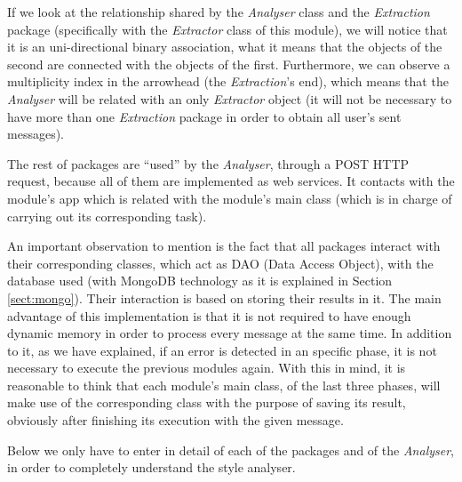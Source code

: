 If we look at the relationship shared by the \textit{Analyser} class and the \textit{Extraction} package (specifically with the \textit{Extractor} class of this module), we will notice that it is an uni-directional binary association, what it means that the objects of the second are connected with the objects of the first. Furthermore, we can observe a multiplicity index in the arrowhead (the \textit{Extraction}'s end), which means that the \textit{Analyser} will be related with an only \textit{Extractor} object (it will not be necessary to have more than one \textit{Extraction} package in order to obtain all user's sent messages).

The rest of packages are ``used'' by the \textit{Analyser}, through a POST HTTP request, because all of them are implemented as web services. It contacts with the module's app which is related with the module's main class (which is in charge of carrying out its corresponding task).

An important observation to mention is the fact that all packages interact with their corresponding classes, which act as DAO (Data Access Object), with the database used (with MongoDB technology as it is explained in Section \ref{sect:mongo}). Their interaction is based on storing their results in it. The main advantage of this implementation is that it is not required to have enough dynamic memory in order to process every message at the same time. In addition to it, as we have explained, if an error is detected in an specific phase, it is not necessary to execute the previous modules again. With this in mind, it is reasonable to think that each module's main class, of the last three phases, will make use of the corresponding class with the purpose of saving its result, obviously after finishing its execution with the given message.

Below we only have to enter in detail of each of the packages and of the \textit{Analyser}, in order to completely understand the style analyser.